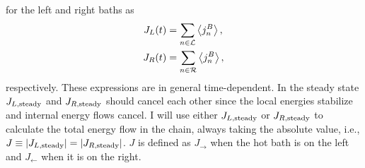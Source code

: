 for the left and right baths as
%
\begin{equation}
    \begin{split}
        J_L (t)&= \sum_{n\in {\cal L}} \expval{j^B_n},\\
        J_R (t)&= \sum_{n\in {\cal R}} \expval{j^B_n},
    \end{split}
    \label{eq:chapter5_BathHeatFlows}
\end{equation}
%
respectively. These expressions are in general time-dependent. In the steady state $J_{L,{\rm steady}}$ and $J_{R,{\rm steady}}$ should cancel each other since the local energies stabilize and internal energy flows cancel. I will use either $J_{L,{\rm steady}}$ or $J_{R,{\rm steady}}$ to calculate the total energy flow in the chain, always taking the absolute value, i.e., $J \equiv \abs{J_{L,{\rm steady}}}= \abs{J_{R,{\rm steady}}}$. $J$ is defined as $J_\rightarrow$ when the hot bath is on the left
and $J_\leftarrow$ when it is on the right.

